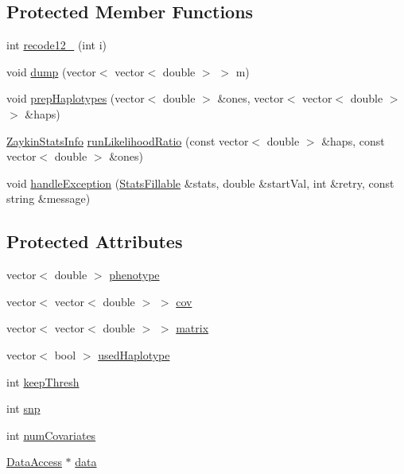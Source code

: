 \subsection*{Protected Member Functions}
\begin{DoxyCompactItemize}
\item 
int \hyperlink{classZaykin_aaaee27a7e56db508adf3f2c9bb9229d4}{recode12\_} (int i)
\item 
void \hyperlink{classZaykin_a3a3b137409b8c862a66c70ce199721f6}{dump} (vector$<$ vector$<$ double $>$ $>$ m)
\item 
void \hyperlink{classZaykin_a769d85be4c6a2e177db4ae826259b5a1}{prepHaplotypes} (vector$<$ double $>$ \&ones, vector$<$ vector$<$ double $>$ $>$ \&haps)
\item 
\hyperlink{classZaykinStatsInfo}{ZaykinStatsInfo} \hyperlink{classZaykin_a48c7abad236fd142ec7da0e17da86356}{runLikelihoodRatio} (const vector$<$ double $>$ \&haps, const vector$<$ double $>$ \&ones)
\item 
void \hyperlink{classZaykin_aca4c79d7edc3bf5a62c73eb95d0ffb28}{handleException} (\hyperlink{classStatsFillable}{StatsFillable} \&stats, double \&startVal, int \&retry, const string \&message)
\end{DoxyCompactItemize}
\subsection*{Protected Attributes}
\begin{DoxyCompactItemize}
\item 
vector$<$ double $>$ \hyperlink{classZaykin_a19b6fa76c263b5eb7793957770bd4e22}{phenotype}
\item 
vector$<$ vector$<$ double $>$ $>$ \hyperlink{classZaykin_a7ab5edcff9494a41aef72ce33926bcb4}{cov}
\item 
vector$<$ vector$<$ double $>$ $>$ \hyperlink{classZaykin_ad86108c46b3feda98fd722146df86cec}{matrix}
\item 
vector$<$ bool $>$ \hyperlink{classZaykin_a7f47e07456e480212833d09b732be913}{usedHaplotype}
\item 
int \hyperlink{classZaykin_aae179a8aaed20ab73b219763a8bd8495}{keepThresh}
\item 
int \hyperlink{classZaykin_a03181d0afbfb93c0206e5c679561cafb}{snp}
\item 
int \hyperlink{classZaykin_ad0b5f025c5cffe4ef14f1685e956faa5}{numCovariates}
\item 
\hyperlink{classDataAccess}{DataAccess} $\ast$ \hyperlink{classZaykin_a08bb927fb1ddebabaa02cfc3fe3c21b2}{data}
\end{DoxyCompactItemize}
